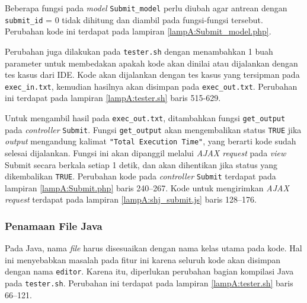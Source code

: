 Beberapa fungsi pada \textit{model} \verb|Submit_model| perlu diubah agar antrean dengan \verb|submit_id| = 0 tidak dihitung dan diambil pada fungsi-fungsi tersebut. Perubahan kode ini terdapat pada lampiran \ref{lampA:Submit_model.php}.

Perubahan juga dilakukan pada \verb|tester.sh| dengan menambahkan 1 buah parameter untuk membedakan apakah kode akan dinilai atau dijalankan dengan tes kasus dari IDE. Kode akan dijalankan dengan tes kasus yang tersipman pada \verb|exec_in.txt|, kemudian hasilnya akan disimpan pada \verb|exec_out.txt|. Perubahan ini terdapat pada lampiran \ref{lampA:tester.sh} baris 515-629. 

Untuk mengambil hasil pada \verb|exec_out.txt|, ditambahkan fungsi \verb|get_output| pada  \textit{controller} \verb|Submit|. Fungsi \verb|get_output| akan mengembalikan status \verb|TRUE| jika \textit{output} mengandung kalimat \verb|"Total Execution Time"|, yang berarti kode sudah selesai dijalankan.  Fungsi ini akan dipanggil melalui \textit{AJAX request} pada \textit{view} Submit secara berkala setiap 1 detik, dan akan dihentikan jika status yang dikembalikan \verb|TRUE|. Perubahan kode pada \textit{controller} \verb|Submit| terdapat pada lampiran \ref{lampA:Submit.php} baris 240--267. Kode untuk mengirimkan \textit{AJAX request} terdapat pada lampiran \ref{lampA:shj_submit.js} baris 128--176.

\subsubsection{Penamaan File Java}

Pada Java, nama \textit{file} harus disesuaikan dengan nama kelas utama pada kode. Hal ini menyebabkan masalah pada fitur ini karena seluruh kode akan disimpan dengan nama \verb|editor|. Karena itu, diperlukan perubahan bagian kompilasi Java pada \verb|tester.sh|. Perubahan ini terdapat pada lampiran \ref{lampA:tester.sh} baris 66--121. 

